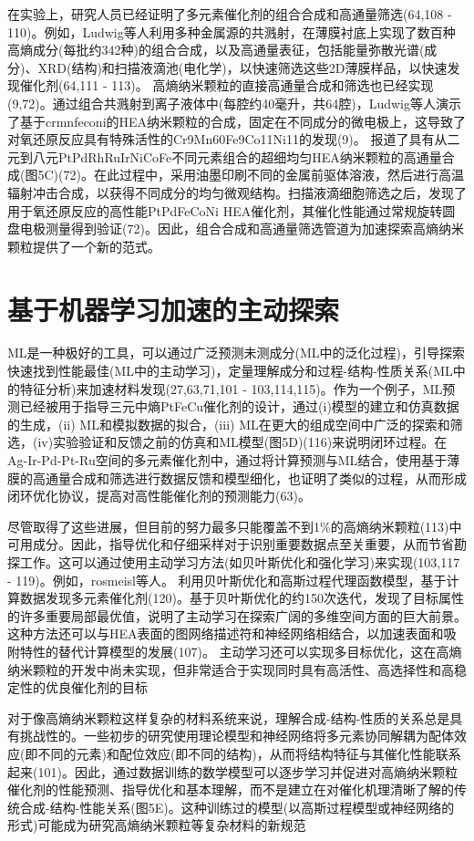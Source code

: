 \documentclass[a4paper]{article}
\begin{document}
在实验上，研究人员已经证明了多元素催化剂的组合合成和高通量筛选(64,108 - 110)。例如，Ludwig等人利用多种金属源的共溅射，在薄膜衬底上实现了数百种高熵成分(每批约342种)的组合合成，以及高通量表征，包括能量弥散光谱(成分)、XRD(结构)和扫描液滴池(电化学)，以快速筛选这些2D薄膜样品，以快速发现催化剂(64,111 - 113)。
高熵纳米颗粒的直接高通量合成和筛选也已经实现(9,72)。通过组合共溅射到离子液体中(每腔约40毫升，共64腔)，Ludwig等人演示了基于crmnfeconi的HEA纳米颗粒的合成，固定在不同成分的微电极上，这导致了对氧还原反应具有特殊活性的Cr9Mn60Fe9Co11Ni11的发现(9)。
报道了具有从二元到八元PtPdRhRuIrNiCoFe不同元素组合的超细均匀HEA纳米颗粒的高通量合成(图5C)(72)。在此过程中，采用油墨印刷不同的金属前驱体溶液，然后进行高温辐射冲击合成，以获得不同成分的均匀微观结构。扫描液滴细胞筛选之后，发现了用于氧还原反应的高性能PtPdFeCoNi HEA催化剂，其催化性能通过常规旋转圆盘电极测量得到验证(72)。因此，组合合成和高通量筛选管道为加速探索高熵纳米颗粒提供了一个新的范式。


\section*{基于机器学习加速的主动探索}
ML是一种极好的工具，可以通过广泛预测未测成分(ML中的泛化过程)，引导探索快速找到性能最佳(ML中的主动学习)，定量理解成分和过程-结构-性质关系(ML中的特征分析)来加速材料发现(27,63,71,101 - 103,114,115)。作为一个例子，ML预测已经被用于指导三元中熵PtFeCu催化剂的设计，通过(i)模型的建立和仿真数据的生成，(ii) ML和模拟数据的拟合，(iii) ML在更大的组成空间中广泛的探索和筛选，(iv)实验验证和反馈之前的仿真和ML模型(图5D)(116)来说明闭环过程。在Ag-Ir-Pd-Pt-Ru空间的多元素催化剂中，通过将计算预测与ML结合，使用基于薄膜的高通量合成和筛选进行数据反馈和模型细化，也证明了类似的过程，从而形成闭环优化协议，提高对高性能催化剂的预测能力(63)。


尽管取得了这些进展，但目前的努力最多只能覆盖不到1\%的高熵纳米颗粒(113)中可用成分。因此，指导优化和仔细采样对于识别重要数据点至关重要，从而节省勘探工作。这可以通过使用主动学习方法(如贝叶斯优化和强化学习)来实现(103,117 - 119)。例如，rosmeisl等人。
利用贝叶斯优化和高斯过程代理函数模型，基于计算数据发现多元素催化剂(120)。基于贝叶斯优化的约150次迭代，发现了目标属性的许多重要局部最优值，说明了主动学习在探索广阔的多维空间方面的巨大前景。
这种方法还可以与HEA表面的图网络描述符和神经网络相结合，以加速表面和吸附特性的替代计算模型的发展(107)。
主动学习还可以实现多目标优化，这在高熵纳米颗粒的开发中尚未实现，但非常适合于实现同时具有高活性、高选择性和高稳定性的优良催化剂的目标


对于像高熵纳米颗粒这样复杂的材料系统来说，理解合成-结构-性质的关系总是具有挑战性的。一些初步的研究使用理论模型和神经网络将多元素协同解耦为配体效应(即不同的元素)和配位效应(即不同的结构)，从而将结构特征与其催化性能联系起来(101)。因此，通过数据训练的数学模型可以逐步学习并促进对高熵纳米颗粒催化剂的性能预测、指导优化和基本理解，而不是建立在对催化机理清晰了解的传统合成-结构-性能关系(图5E)。这种训练过的模型(以高斯过程模型或神经网络的形式)可能成为研究高熵纳米颗粒等复杂材料的新规范
\end{document}
